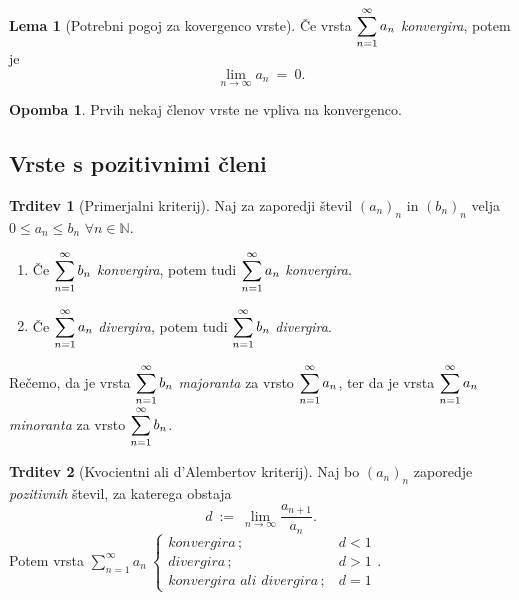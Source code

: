 \documentclass[11pt]{article}
\newcommand{\N}{\mathbb{N}}
\theoremstyle{definition}
\theoremstyle{definition}
\newtheorem{trditev}{Trditev}[section]
\theoremstyle{definition}
\theoremstyle{theorem}
\newtheorem{lema}{Lema}
\newtheorem*{opomba}{Opomba}
\begin{document}
\begin{lema}[Potrebni pogoj za kovergenco vrste]

Če vrsta $\mathlarger{\sum_{n=1}^\infty a_n}$ \textit{konvergira}, potem je 
$$\lim_{n \rightarrow \infty} a_n ~=~ 0.$$

\end{lema}
\vspace{0.5cm}

\begin{opomba}

Prvih nekaj členov vrste ne vpliva na konvergenco.

\end{opomba}
\vspace{0.5cm}

\pagebreak


\subsection{Vrste s pozitivnimi členi}
\vspace{0.5cm}

\begin{trditev}[Primerjalni kriterij]

Naj za zaporedji števil $(a_n)_n$ in $(b_n)_n$ velja $0 \leq a_n \leq b_n$ $\forall n \in \N$.
\begin{enumerate}

	\item[(1)] Če $\mathlarger{\sum_{n=1}^\infty b_n}$ \textit{konvergira}, potem tudi $\mathlarger{\sum_{n=1}^\infty a_n}$ \textit{konvergira}.
	
	\item[(2)] Če $\mathlarger{\sum_{n=1}^\infty a_n}$ \textit{divergira}, potem tudi $\mathlarger{\sum_{n=1}^\infty b_n}$ \textit{divergira}.

\end{enumerate}
Rečemo, da je vrsta $\mathlarger{\sum_{n=1}^\infty b_n}$ \textit{majoranta} za vrsto $\mathlarger{\sum_{n=1}^\infty a_n}$, ter da je vrsta $\mathlarger{\sum_{n=1}^\infty a_n}$ \textit{minoranta} za vrsto $\mathlarger{\sum_{n=1}^\infty b_n}$.

\end{trditev}
\vspace{0.5cm}

\begin{trditev}[Kvocientni ali d'Alembertov kriterij]

Naj bo $(a_n)_n$ zaporedje \textit{pozitivnih} števil, za katerega obstaja
$$d ~:=~ \lim_{n \rightarrow \infty} \frac{a_{n+1}}{a_n}.$$
Potem vrsta $\sum_{n=1}^\infty a_n ~ \begin{cases}
\textit{konvergira}\,; ~&d<1\\
\textit{divergira}\,; ~&d>1 \\
\textit{konvergira ali divergira}\,; ~&d=1
\end{cases}.$ 

\end{trditev}
\vspace{0.5cm}
\end{document}
